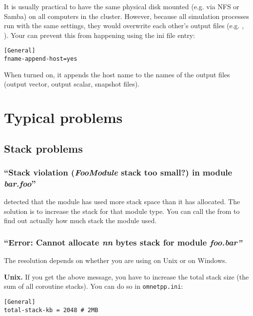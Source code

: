 It is usually practical to have the same physical disk mounted (e.g. via NFS or Samba)
on all computers in the cluster. However, because all {\opp} simulation
processes run with the same settings, they would overwrite each other's
output files (e.g. , ).
Your can prevent this from happening using the
 ini file entry:

\begin{verbatim}
[General]
fname-append-host=yes
\end{verbatim}

When turned on, it appends the host name to the names of the output
files (output vector, output scalar, snapshot files).



\section{Typical problems}

\subsection{Stack problems}

\subsubsection{``Stack violation (\textit{FooModule} stack too small?) in module \textit{bar.foo}''}

{\opp} detected that the module has used more stack space than it has
allocated. The solution is to increase the stack for that module type.
You can call the  from  to find out
actually how much stack the module used.


\subsubsection{``Error: Cannot allocate \textit{nn} bytes stack for module \textit{foo.bar''}}

The resolution depends on whether you are using {\opp} on Unix or on Windows.

\textbf{Unix.}
If you get the above message, you have to increase the total stack
size (the sum of all coroutine stacks). You can do
so in \texttt{omnetpp.ini}:

\begin{verbatim}
[General]
total-stack-kb = 2048 # 2MB
\end{verbatim}


